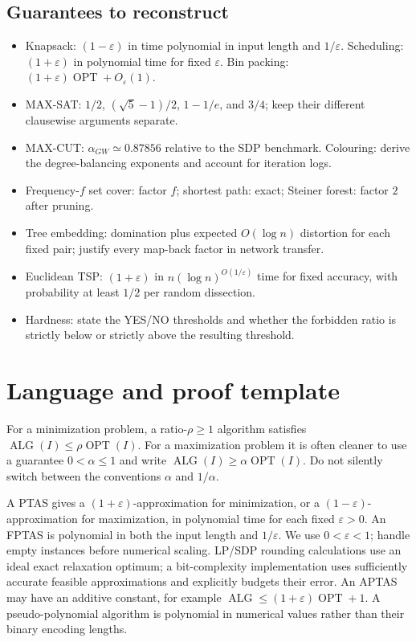 \documentclass[11pt,a4paper]{article}
\newcommand{\OPT}{\operatorname{OPT}}
\newcommand{\ALG}{\operatorname{ALG}}
\newcommand{\1}{\mathbf 1}
\begin{document}
\subsection{Guarantees to reconstruct}
\begin{itemize}
\item Knapsack: $(1-\varepsilon)$ in time polynomial in input length and $1/\varepsilon$.
Scheduling: $(1+\varepsilon)$ in polynomial time for fixed $\varepsilon$.
Bin packing: $(1+\varepsilon)\OPT+O_\varepsilon(1)$.
\item MAX-SAT: $1/2$, $(\sqrt5-1)/2$, $1-1/e$, and $3/4$;
keep their different clausewise arguments separate.
\item MAX-CUT: $\alpha_{GW}\simeq0.87856$ relative to the SDP benchmark.
Colouring: derive the degree-balancing exponents and account for iteration logs.
\item Frequency-$f$ set cover: factor $f$; shortest path: exact;
Steiner forest: factor $2$ after pruning.
\item Tree embedding: domination plus expected $O(\log n)$ distortion for each
fixed pair; justify every map-back factor in network transfer.
\item Euclidean TSP: $(1+\varepsilon)$ in $n(\log n)^{O(1/\varepsilon)}$
time for fixed accuracy, with probability at least $1/2$ per random dissection.
\item Hardness: state the YES/NO thresholds and whether the forbidden ratio
is strictly below or strictly above the resulting threshold.
\end{itemize}
\section{Language and proof template}

For a minimization problem, a ratio-$\rho\geq1$ algorithm satisfies
$\ALG(I)\leq\rho\OPT(I)$.  For a maximization problem it is often cleaner to
use a guarantee $0<\alpha\leq1$ and write $\ALG(I)\geq\alpha\OPT(I)$.
Do not silently switch between the conventions $\alpha$ and $1/\alpha$.

A PTAS gives a $(1+\varepsilon)$-approximation for minimization, or a
$(1-\varepsilon)$-approximation for maximization, in polynomial time for each
fixed $\varepsilon>0$.  An FPTAS is polynomial in both the input length and
$1/\varepsilon$. We use $0<\varepsilon<1$; handle empty instances before numerical scaling. LP/SDP rounding calculations use an ideal exact relaxation optimum; a bit-complexity implementation uses sufficiently accurate feasible approximations and explicitly budgets their error.  An APTAS may have an additive constant, for example
$\ALG\leq(1+\varepsilon)\OPT+1$.  A pseudo-polynomial algorithm is polynomial
in numerical values rather than their binary encoding lengths.
\end{document}
